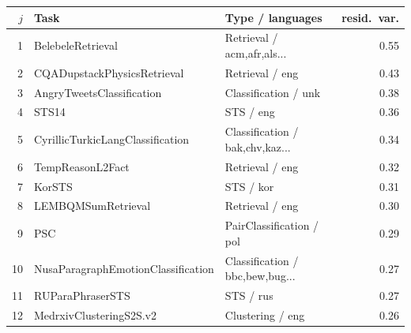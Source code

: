 \begin{tabular}{rllr}\toprule
$j$ & Task & Type / languages & resid.\ var. \\\midrule
1 & BelebeleRetrieval & Retrieval / acm,afr,als... & 0.55 \\
2 & CQADupstackPhysicsRetrieval & Retrieval / eng & 0.43 \\
3 & AngryTweetsClassification & Classification / unk & 0.38 \\
4 & STS14 & STS / eng & 0.36 \\
5 & CyrillicTurkicLangClassification & Classification / bak,chv,kaz... & 0.34 \\
6 & TempReasonL2Fact & Retrieval / eng & 0.32 \\
7 & KorSTS & STS / kor & 0.31 \\
8 & LEMBQMSumRetrieval & Retrieval / eng & 0.30 \\
9 & PSC & PairClassification / pol & 0.29 \\
10 & NusaParagraphEmotionClassification & Classification / bbc,bew,bug... & 0.27 \\
11 & RUParaPhraserSTS & STS / rus & 0.27 \\
12 & MedrxivClusteringS2S.v2 & Clustering / eng & 0.26 \\
\bottomrule\end{tabular}
